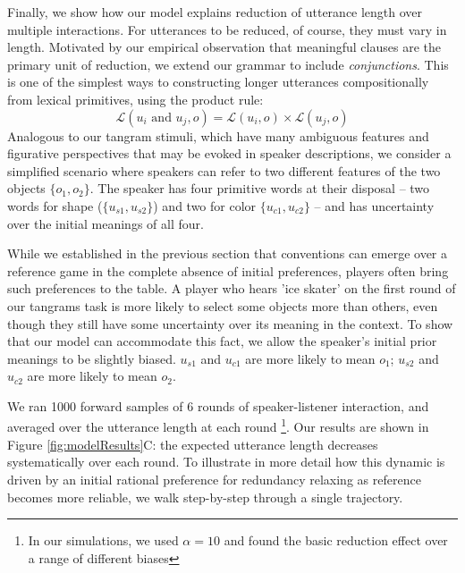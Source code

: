 Finally, we show how our model explains reduction of utterance length over multiple interactions. For utterances to be reduced, of course, they must vary in length. Motivated by our empirical observation that meaningful clauses are the primary unit of reduction, we extend our grammar to include \emph{conjunctions}. This is one of the simplest ways to constructing longer utterances compositionally from lexical primitives, using the product rule:
$$\mathcal{L}(u_i \textrm{ and } u_j, o) = \mathcal{L}(u_i, o) \times \mathcal{L}(u_j, o)$$
\indent Analogous to our tangram stimuli, which have many ambiguous features and figurative perspectives that may be evoked in speaker descriptions, we consider a simplified scenario where speakers can refer to two different features of the two objects $\{o_1, o_2\}$. The speaker has four primitive words at their disposal -- two words for shape ($\{u_{s1}, u_{s2}\}$) and two for color $\{u_{c1}, u_{c2}\}$ -- and has uncertainty over the initial meanings of all four.

While we established in the previous section that conventions can emerge over a reference game in the complete absence of initial preferences, players often bring such preferences to the table. A player who hears 'ice skater' on the first round of our tangrams task is more likely to select some objects more than others, even though they still have some uncertainty over its meaning in the context. To show that our model can accommodate this fact, we allow the speaker's initial prior meanings to be slightly biased. $u_{s1}$ and $u_{c1}$ are more likely to mean $o_1$; $u_{s2}$ and $u_{c2}$ are more likely to mean $o_2$.

We ran 1000 forward samples of 6 rounds of speaker-listener interaction, and averaged over the utterance length at each round \footnote{In our simulations, we used $\alpha = 10$ and found the basic reduction effect over a range of different biases}. Our results are shown in Figure \ref{fig:modelResults}C: the expected utterance length decreases systematically over each round. To illustrate in more detail how this dynamic is driven by an initial rational preference for redundancy relaxing as reference becomes more reliable, we walk step-by-step through a single trajectory. 

